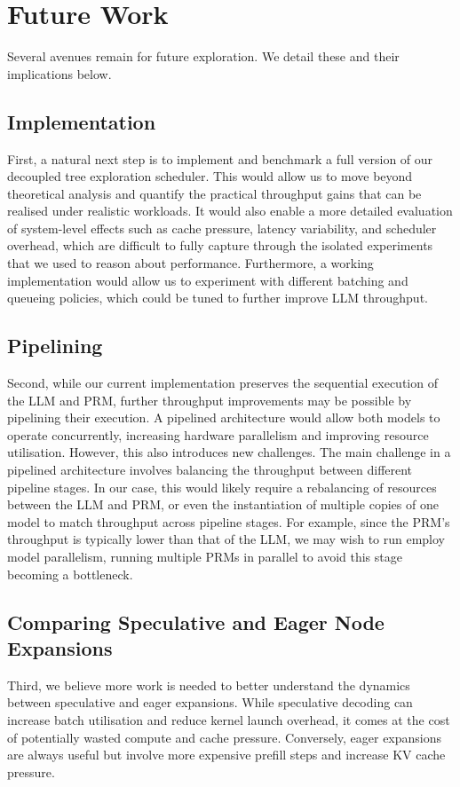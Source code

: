 \documentclass[12pt,twoside]{report}
\begin{document}
\section{Future Work}
Several avenues remain for future exploration.
We detail these and their implications below.

\subsection{Implementation}
First, a natural next step is to implement and benchmark a full version of our decoupled tree exploration scheduler.
This would allow us to move beyond theoretical analysis and quantify the practical throughput gains that can be realised under realistic workloads.
It would also enable a more detailed evaluation of system-level effects such as cache pressure, latency variability, and scheduler overhead, which are difficult to fully capture through the isolated experiments that we used to reason about performance.
Furthermore, a working implementation would allow us to experiment with different batching and queueing policies, which could be tuned to further improve LLM throughput.

\subsection{Pipelining}
Second, while our current implementation preserves the sequential execution of the LLM and PRM, further throughput improvements may be possible by pipelining their execution.
A pipelined architecture would allow both models to operate concurrently, increasing hardware parallelism and improving resource utilisation.
However, this also introduces new challenges.
The main challenge in a pipelined architecture involves balancing the throughput between different pipeline stages.
In our case, this would likely require a rebalancing of resources between the LLM and PRM, or even the instantiation of multiple copies of one model to match throughput across pipeline stages.
For example, since the PRM's throughput is typically lower than that of the LLM, we may wish to run employ model parallelism, running multiple PRMs in parallel to avoid this stage becoming a bottleneck.

\subsection{Comparing Speculative and Eager Node Expansions}
Third, we believe more work is needed to better understand the dynamics between speculative and eager expansions.
While speculative decoding can increase batch utilisation and reduce kernel launch overhead, it comes at the cost of potentially wasted compute and cache pressure.
Conversely, eager expansions are always useful but involve more expensive prefill steps and increase KV cache pressure.
\end{document}

